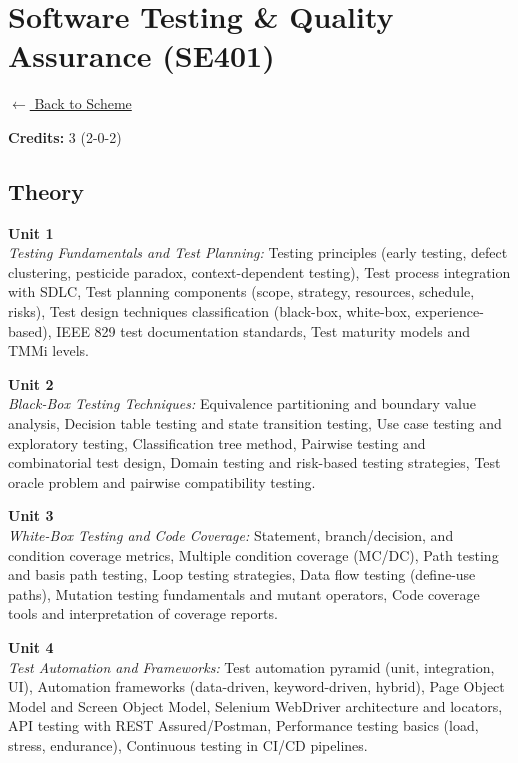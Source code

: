 \section*{Software Testing \& Quality Assurance (SE401)}
\label{major:SE_4}

\noindent \small{\hyperref[main:scheme]{$\leftarrow$ Back to Scheme}} \vspace{0.5cm}

\noindent \textbf{Credits:} 3 (2-0-2)

\subsection*{Theory}
\noindent\textbf{Unit 1} \\
\textit{Testing Fundamentals and Test Planning:} Testing principles (early testing, defect clustering, pesticide paradox, context-dependent testing), Test process integration with SDLC, Test planning components (scope, strategy, resources, schedule, risks), Test design techniques classification (black-box, white-box, experience-based), IEEE 829 test documentation standards, Test maturity models and TMMi levels.

\vspace{0.3cm}

\noindent\textbf{Unit 2} \\
\textit{Black-Box Testing Techniques:} Equivalence partitioning and boundary value analysis, Decision table testing and state transition testing, Use case testing and exploratory testing, Classification tree method, Pairwise testing and combinatorial test design, Domain testing and risk-based testing strategies, Test oracle problem and pairwise compatibility testing.

\vspace{0.3cm}

\noindent\textbf{Unit 3} \\
\textit{White-Box Testing and Code Coverage:} Statement, branch/decision, and condition coverage metrics, Multiple condition coverage (MC/DC), Path testing and basis path testing, Loop testing strategies, Data flow testing (define-use paths), Mutation testing fundamentals and mutant operators, Code coverage tools and interpretation of coverage reports.

\vspace{0.3cm}

\noindent\textbf{Unit 4} \\
\textit{Test Automation and Frameworks:} Test automation pyramid (unit, integration, UI), Automation frameworks (data-driven, keyword-driven, hybrid), Page Object Model and Screen Object Model, Selenium WebDriver architecture and locators, API testing with REST Assured/Postman, Performance testing basics (load, stress, endurance), Continuous testing in CI/CD pipelines.

